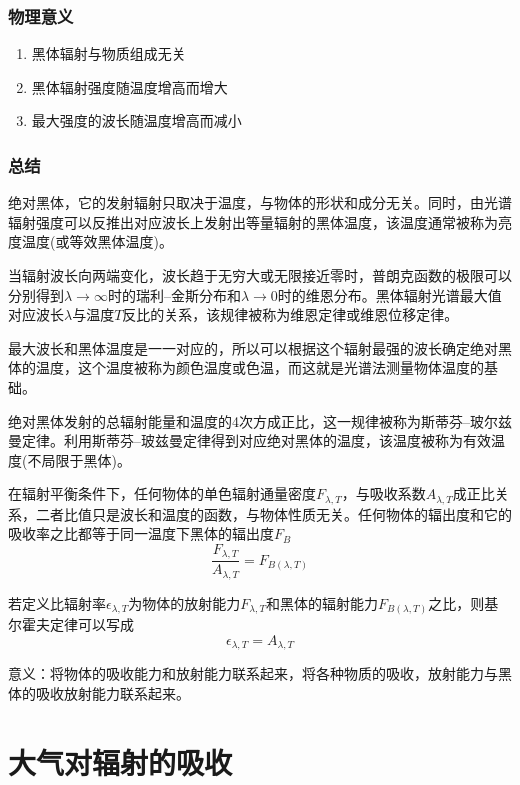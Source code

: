 \documentclass[UTF8,a4paper,11pt,oneside]{ctexbook}
\begin{document}
\subsubsection{物理意义}
\begin{enumerate}
    \item 黑体辐射与物质组成无关
    \item 黑体辐射强度随温度增高而增大
    \item 最大强度的波长随温度增高而减小
\end{enumerate}

\subsubsection{总结}

绝对黑体，它的发射辐射只取决于温度，与物体的形状和成分无关。同时，由光谱辐射强度可以反推出对应波长上发射出等量辐射的黑体温度，该温度通常被称为亮度温度(或等效黑体温度)。

当辐射波长向两端变化，波长趋于无穷大或无限接近零时，普朗克函数的极限可以分别得到\(\lambda\rightarrow\infty\)时的瑞利--金斯分布和\(\lambda\rightarrow{}0\)时的维恩分布。黑体辐射光谱最大值对应波长\(\lambda\)与温度\(T\)反比的关系，该规律被称为维恩定律或维恩位移定律。

最大波长和黑体温度是一一对应的，所以可以根据这个辐射最强的波长确定绝对黑体的温度，这个温度被称为颜色温度或色温，而这就是光谱法测量物体温度的基础。

绝对黑体发射的总辐射能量和温度的4次方成正比，这一规律被称为斯蒂芬--玻尔兹曼定律。利用斯蒂芬--玻兹曼定律得到对应绝对黑体的温度，该温度被称为有效温度(不局限于黑体)。

在辐射平衡条件下，任何物体的单色辐射通量密度\(F_{\lambda,T}\)，与吸收系数\(A_{\lambda,T}\)成正比关系，二者比值只是波长和温度的函数，与物体性质无关。任何物体的辐出度和它的吸收率之比都等于同一温度下黑体的辐出度\(F_B\)
\begin{equation}
\dfrac{F_{\lambda,T}}{A_{\lambda,T}}=F_{B(\lambda,T)}
\end{equation}

若定义比辐射率\(\epsilon _{\lambda,T}\)为物体的放射能力\(F_{\lambda,T}\)和黑体的辐射能力\(F_{B(\lambda,T)}\)之比，则基尔霍夫定律可以写成
\begin{equation}
\epsilon _{\lambda,T}=A_{\lambda,T}
\end{equation}

意义：将物体的吸收能力和放射能力联系起来，将各种物质的吸收，放射能力与黑体的吸收放射能力联系起来。

\section{大气对辐射的吸收}
\end{document}
